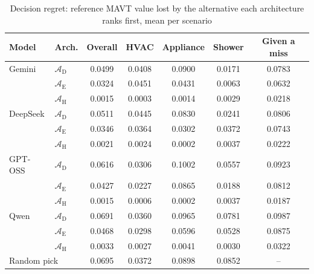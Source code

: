 \begin{table}[htbp]
\centering
\footnotesize
\caption{Decision regret: reference MAVT value lost by the alternative each architecture ranks first, mean per scenario}
\label{tab:decision_regret}
\renewcommand{\arraystretch}{1.15}
\setlength{\tabcolsep}{4pt}
\begin{tabular}{ll cccc c}
\toprule
Model & Arch. & Overall & HVAC & Appliance & Shower & Given a miss \\
\midrule
Gemini & $\mathcal{A}_{\text{D}}$ & 0.0499 & 0.0408 & 0.0900 & 0.0171 & 0.0783 \\
 & $\mathcal{A}_{\text{E}}$ & 0.0324 & 0.0451 & 0.0431 & 0.0063 & 0.0632 \\
 & $\mathcal{A}_{\text{H}}$ & 0.0015 & 0.0003 & 0.0014 & 0.0029 & 0.0218 \\
\addlinespace
DeepSeek & $\mathcal{A}_{\text{D}}$ & 0.0511 & 0.0445 & 0.0830 & 0.0241 & 0.0806 \\
 & $\mathcal{A}_{\text{E}}$ & 0.0346 & 0.0364 & 0.0302 & 0.0372 & 0.0743 \\
 & $\mathcal{A}_{\text{H}}$ & 0.0021 & 0.0024 & 0.0002 & 0.0037 & 0.0222 \\
\addlinespace
GPT-OSS & $\mathcal{A}_{\text{D}}$ & 0.0616 & 0.0306 & 0.1002 & 0.0557 & 0.0923 \\
 & $\mathcal{A}_{\text{E}}$ & 0.0427 & 0.0227 & 0.0865 & 0.0188 & 0.0812 \\
 & $\mathcal{A}_{\text{H}}$ & 0.0015 & 0.0006 & 0.0002 & 0.0037 & 0.0187 \\
\addlinespace
Qwen & $\mathcal{A}_{\text{D}}$ & 0.0691 & 0.0360 & 0.0965 & 0.0781 & 0.0987 \\
 & $\mathcal{A}_{\text{E}}$ & 0.0468 & 0.0298 & 0.0596 & 0.0528 & 0.0875 \\
 & $\mathcal{A}_{\text{H}}$ & 0.0033 & 0.0027 & 0.0041 & 0.0030 & 0.0322 \\

\midrule
\multicolumn{2}{l}{Random pick} & 0.0695 & 0.0372 & 0.0898 & 0.0852 & -- \\
\bottomrule
\end{tabular}
\setlength{\tabcolsep}{6pt}
\renewcommand{\arraystretch}{1.0}
\end{table}


